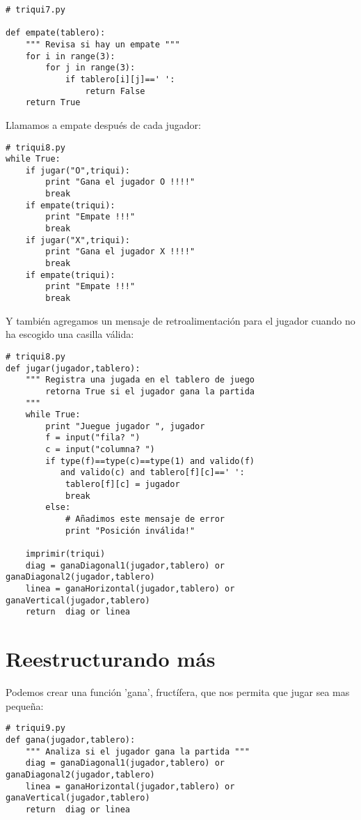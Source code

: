 \beforeverb
\begin{verbatim}
# triqui7.py

def empate(tablero):
    """ Revisa si hay un empate """
    for i in range(3):
        for j in range(3):
            if tablero[i][j]==' ':
                return False
    return True

\end{verbatim}
\afterverb

Llamamos a empate después de cada jugador:
\beforeverb
\begin{verbatim}
# triqui8.py
while True:
    if jugar("O",triqui):
        print "Gana el jugador O !!!!"
        break
    if empate(triqui):
        print "Empate !!!"
        break
    if jugar("X",triqui):
        print "Gana el jugador X !!!!"
        break
    if empate(triqui):
        print "Empate !!!"
        break
\end{verbatim}
\afterverb

Y también agregamos un mensaje de retroalimentación para el jugador cuando no 
ha escogido una casilla válida:

\beforeverb
\begin{verbatim}
# triqui8.py
def jugar(jugador,tablero):
    """ Registra una jugada en el tablero de juego
        retorna True si el jugador gana la partida
    """
    while True:     
        print "Juegue jugador ", jugador
        f = input("fila? ")
        c = input("columna? ")
        if type(f)==type(c)==type(1) and valido(f) 
           and valido(c) and tablero[f][c]==' ':
            tablero[f][c] = jugador
            break
        else:
            # Añadimos este mensaje de error
            print "Posición inválida!"

    imprimir(triqui)
    diag = ganaDiagonal1(jugador,tablero) or ganaDiagonal2(jugador,tablero)
    linea = ganaHorizontal(jugador,tablero) or ganaVertical(jugador,tablero)
    return  diag or linea
\end{verbatim}
\afterverb

\section{Reestructurando más}

Podemos crear una función 'gana', fructífera, que nos permita que jugar sea
mas pequeña:

\begin{verbatim}
# triqui9.py
def gana(jugador,tablero):
    """ Analiza si el jugador gana la partida """
    diag = ganaDiagonal1(jugador,tablero) or ganaDiagonal2(jugador,tablero)
    linea = ganaHorizontal(jugador,tablero) or ganaVertical(jugador,tablero)
    return  diag or linea

\end{verbatim}
\afterverb

